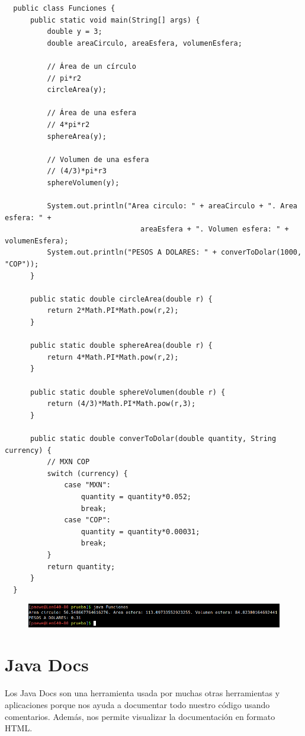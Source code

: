\documentclass{article}
\begin{document}
\begin{verbatim}
  public class Funciones {
      public static void main(String[] args) {
          double y = 3;
          double areaCirculo, areaEsfera, volumenEsfera;

          // Área de un círculo
          // pi*r2
          circleArea(y);

          // Área de una esfera
          // 4*pi*r2
          sphereArea(y);

          // Volumen de una esfera
          // (4/3)*pi*r3
          sphereVolumen(y);

          System.out.println("Area circulo: " + areaCirculo + ". Area esfera: " +
                                areaEsfera + ". Volumen esfera: " + volumenEsfera);
          System.out.println("PESOS A DOLARES: " + converToDolar(1000, "COP"));
      }

      public static double circleArea(double r) {
          return 2*Math.PI*Math.pow(r,2);
      }

      public static double sphereArea(double r) {
          return 4*Math.PI*Math.pow(r,2);
      }

      public static double sphereVolumen(double r) {
          return (4/3)*Math.PI*Math.pow(r,3);
      }

      public static double converToDolar(double quantity, String currency) {
          // MXN COP
          switch (currency) {
              case "MXN":
                  quantity = quantity*0.052;
                  break;
              case "COP":
                  quantity = quantity*0.00031;
                  break;
          }
          return quantity;
      }
  }
\end{verbatim}

\newpage

\begin{figure}[h!]
  \centering
  \includegraphics[scale=0.75]{./Pictures/049_funciones.png}
\end{figure}


\section{Java Docs}%
Los Java Docs son una herramienta usada por muchas otras herramientas y
aplicaciones porque nos ayuda a documentar todo nuestro código usando
comentarios. Además, nos permite visualizar la documentación en formato HTML.
\end{document}
